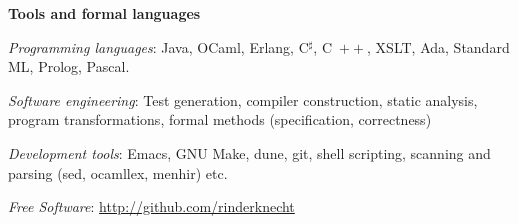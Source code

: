 \documentclass[a4paper,11pt]{article}
\newcommand{\cpp}{\mbox{C \hspace*{-2.5mm} \raise 0.7mm \hbox{${\scriptscriptstyle ++}$}}}
\begin{document}
\bigskip
\noindent\textbf{\large Tools and formal languages}
\medskip
\begin{itemize*}

  \item \textit{Programming languages}: Java, OCaml, Erlang,
    C$^\sharp$, \cpp, XSLT, Ada, Standard ML, Prolog, Pascal.



  \item \textit{Software engineering}: Test generation, compiler
    construction, static analysis, program transformations, formal
    methods (specification, correctness) %



  \item \textit{Development tools}: Emacs, GNU Make, dune, git, shell
    scripting, scanning and parsing (sed, ocamllex, menhir) etc.

  \item \textit{Free Software}: \url{http://github.com/rinderknecht}


\end{itemize*}
\end{document}
